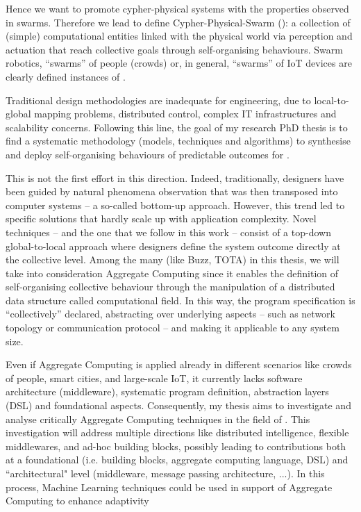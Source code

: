 \documentclass[11pt]{article}
\begin{document}
Hence we want to promote cypher-physical systems with the properties observed in swarms. 
%
Therefore we lead to define Cypher-Physical-Swarm (\cpws): a collection of (simple) computational entities linked with the physical world via perception and actuation that reach collective goals through self-organising behaviours.
%
Swarm robotics, ``swarms” of people (crowds) or, in general, ``swarms” of IoT devices are clearly defined instances of \cpws.

Traditional design methodologies are inadequate for \cpws engineering, due to local-to-global mapping problems, distributed control, complex IT infrastructures and scalability concerns.
%
Following this line, the goal of my research PhD thesis is to find a systematic methodology (models, techniques and algorithms)
to synthesise and deploy self-organising behaviours of predictable outcomes for \cpws.

This is not the first effort in this direction. Indeed, traditionally, designers have been guided
by natural phenomena observation that was then transposed into computer systems -- a so-called
bottom-up approach. 
%
However, this trend led to specific solutions that hardly scale up with application complexity.
Novel techniques -- and the one that we follow in this work -- consist of a top-down global-to-local approach where designers define the system outcome directly at the collective level. 
%
Among the many (like Buzz, TOTA) in this thesis, we will take into consideration Aggregate Computing since it enables the definition of self-organising collective behaviour through the manipulation of a distributed data structure called computational field.
%
In this way, the program specification is “collectively” declared, abstracting over underlying aspects – such as network topology or communication protocol – and making it applicable to any system size. 

Even if Aggregate Computing is applied already in different scenarios like crowds of people, smart cities, and large-scale IoT, it currently lacks software architecture (middleware), systematic program definition, abstraction layers (DSL) and foundational aspects.
%
Consequently, my thesis aims to investigate and analyse critically Aggregate
Computing techniques in the field of \cpws. 
%
This investigation will address multiple directions
like distributed intelligence, flexible middlewares, and ad-hoc building blocks, possibly leading to contributions both at a foundational (i.e. building blocks, aggregate computing language,  DSL) and ``architectural" level (middleware, message passing architecture, ...).
%
In this process, Machine Learning techniques could be used in support of Aggregate Computing to enhance adaptivity
\end{document}
